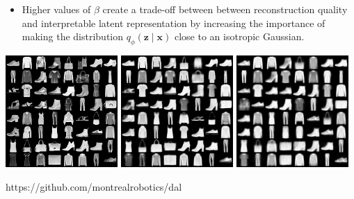\documentclass[a0]{a0poster}
\begin{document}
\begin{minipage}[t]{0.32\textwidth}
\begin{minipage}{1.0\columnwidth}
\begin{itemize}
            \item Higher values of $\beta$ create a trade-off between between reconstruction quality and interpretable latent representation by increasing the importance of making the distribution $q_{\phi}(\mathbf{z}\mid \mathbf{x})$ close to an isotropic Gaussian.
		\end{itemize}
\begin{minipage}{\columnwidth}
	\vspace{1cm}
	\centering
  \includegraphics[width=0.32\textwidth, trim={0 5.3cm 0 0}, clip]{fashion-mnist/original.png}
  \includegraphics[width=0.32\textwidth, trim={0 5.3cm 0 0}, clip]{fashion-mnist/beta1.png}
  \includegraphics[width=0.32\textwidth, trim={0 5.3cm 0 0}, clip]{fashion-mnist/beta4.png}\\
  \vspace{1cm}
\end{minipage}
	\end{minipage}

\Large
{} https://github.com/montrealrobotics/dal 
    
\end{minipage}
\end{document}
